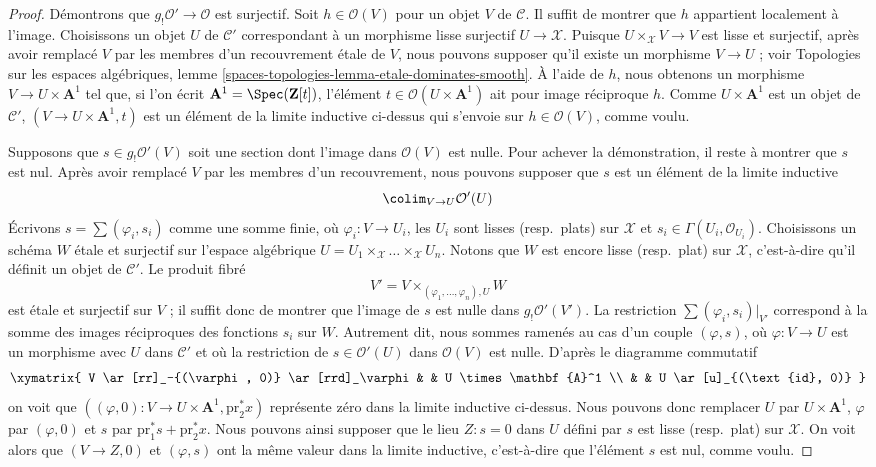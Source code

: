 \begin{proof}
\medskip\noindent
Démontrons que $g_!\mathcal{O}' \to \mathcal{O}$ est surjectif.
Soit $h \in \mathcal{O}(V)$ pour un objet $V$ de $\mathcal{C}$.
Il suffit de montrer que $h$ appartient localement à l'image. Choisissons un objet
$U$ de $\mathcal{C}'$ correspondant à un morphisme lisse surjectif
$U \to \mathcal{X}$. Puisque $U \times_\mathcal{X} V \to V$ est lisse et
surjectif, après avoir remplacé $V$ par les membres d'un recouvrement étale de $V$,
nous pouvons supposer qu'il existe un morphisme $V \to U$ ; voir
Topologies sur les espaces algébriques, lemme
\ref{spaces-topologies-lemma-etale-dominates-smooth}. À l'aide de $h$, nous obtenons
un morphisme $V \to U \times \mathbf{A}^1$ tel que, si l'on écrit
$\mathbf{A}^1 = \Spec(\mathbf{Z}[t])$, l'élément
$t \in \mathcal{O}(U \times \mathbf{A}^1)$ ait pour image réciproque $h$.
Comme $U \times \mathbf{A}^1$ est un objet de $\mathcal{C}'$,
$(V \to U \times \mathbf{A}^1, t)$ est un élément de la limite inductive
ci-dessus qui s'envoie sur $h \in \mathcal{O}(V)$,
comme voulu.

\medskip\noindent
Supposons que $s \in g_!\mathcal{O}'(V)$ soit une section
dont l'image dans $\mathcal{O}(V)$ est nulle. Pour achever la démonstration,
il reste à montrer que $s$ est nul. Après avoir remplacé $V$ par les membres
d'un recouvrement, nous pouvons supposer que $s$ est un élément de la limite inductive
$$
\colim_{V \to U} \mathcal{O}'(U)
$$
Écrivons $s = \sum (\varphi_i, s_i)$ comme une somme finie, où
$\varphi_i : V \to U_i$, les $U_i$ sont lisses (resp.\ plats) sur $\mathcal{X}$ et
$s_i \in \Gamma(U_i, \mathcal{O}_{U_i})$. Choisissons un schéma $W$ étale
et surjectif sur l'espace algébrique
$U = U_1 \times_\mathcal{X} \ldots \times_\mathcal{X} U_n$.
Notons que $W$ est encore lisse (resp.\ plat) sur $\mathcal{X}$, c'est-à-dire
qu'il définit un objet de $\mathcal{C}'$. Le produit fibré
$$
V' = V \times_{(\varphi_1, \ldots, \varphi_n), U} W
$$
est étale et surjectif sur $V$ ; il suffit donc de montrer que l'image de $s$
est nulle dans $g_!\mathcal{O}'(V')$. La restriction
$\sum (\varphi_i, s_i)|_{V'}$ correspond à la somme des images réciproques
des fonctions $s_i$ sur $W$. Autrement dit, nous sommes ramenés au cas
d'un couple $(\varphi, s)$, où $\varphi : V \to U$ est un morphisme avec $U$
dans $\mathcal{C}'$ et où la restriction de $s \in \mathcal{O}'(U)$ dans
$\mathcal{O}(V)$ est nulle. D'après le diagramme commutatif
$$
\xymatrix{
V \ar[rr]_-{(\varphi, 0)} \ar[rrd]_\varphi & & U \times \mathbf{A}^1 \\
& & U \ar[u]_{(\text{id}, 0)}
}
$$
on voit que
$((\varphi, 0) : V \to U \times \mathbf{A}^1, \text{pr}_2^*x)$
représente zéro dans la limite inductive ci-dessus. Nous pouvons donc
remplacer $U$ par $U \times \mathbf{A}^1$, $\varphi$ par $(\varphi, 0)$
et $s$ par $\text{pr}_1^*s + \text{pr}_2^*x$. Nous pouvons ainsi supposer que
le lieu $Z : s = 0$ dans $U$ défini par $s$ est lisse (resp.\ plat)
sur $\mathcal{X}$. On voit alors que $(V \to Z, 0)$ et $(\varphi, s)$
ont la même valeur dans la limite inductive, c'est-à-dire que l'élément $s$
est nul, comme voulu.
\end{proof}

